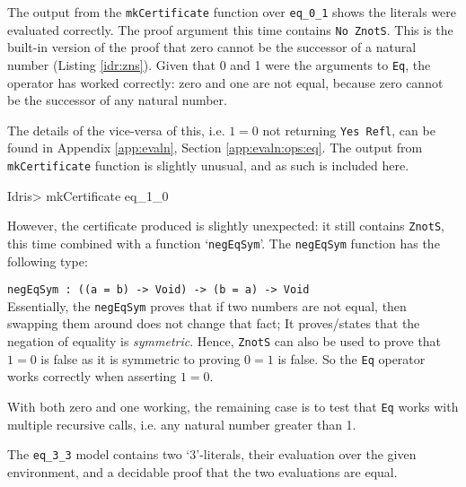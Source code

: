        The output from the \texttt{mkCertificate} function over \texttt{eq\_0\_1} shows the literals were evaluated correctly. The proof argument this time contains \texttt{No ZnotS}. This is the built-in version of the proof that zero cannot be the successor of a natural number (Listing \ref{idr:zns}). Given that 0 and 1 were the arguments to \texttt{Eq}, the operator has worked correctly: zero and one are not equal, because zero cannot be the successor of any natural number.
        
        The details of the vice-versa of this, i.e. $1 = 0$ not returning \texttt{Yes Refl}, can be found in Appendix \ref{app:evaln}, Section \ref{app:evaln:ops:eq}. The output from \texttt{mkCertificate} function is slightly unusual, and as such is included here.
        
        \begin{code}
Idris> mkCertificate eq_1_0
        \end{code}
        
        However, the certificate produced is slightly unexpected: it still contains \texttt{ZnotS}, this time combined with a function `\texttt{negEqSym}'. The \texttt{negEqSym} function has the following type:\par
        \texttt{negEqSym : ((a = b) -> Void) -> (b = a) -> Void}\\
        Essentially, the \texttt{negEqSym} proves that if two numbers are not equal, then swapping them around does not change that fact; It proves/states that the negation of equality is \textit{symmetric}. Hence, \texttt{ZnotS} can also be used to prove that $1 = 0$ is false as it is symmetric to proving $0 = 1$ is false. So the \texttt{Eq} operator works correctly when asserting $1 = 0$.
        
        \newpage
        
        
        
        With both zero and one working, the remaining case is to test that \texttt{Eq} works with multiple recursive calls, i.e. any natural number greater than 1.
        
        
        The \texttt{eq\_3\_3} model contains two `3'-literals, their evaluation over the given environment, and a decidable proof that the two evaluations are equal.
        
